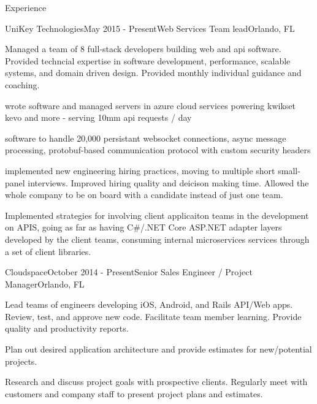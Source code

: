\documentclass{resume} %
\begin{document}
\begin{rSection}{Experience}


\begin{rSubsection}{UniKey Technologies}{May 2015 - Present}{Web Services Team lead}{Orlando, FL}

\item Managed a team of 8 full-stack developers building web and api software.  Provided techncial expertise in software development, performance, scalable systems, and domain driven design.  Provided monthly individual guidance and coaching.
\item wrote software and managed servers in azure cloud services powering kwikset kevo and more - serving 10mm api requests / day
\item software to handle 20,000 persistant websocket connections, async message processing, protobuf-based communication protocol with custom security headers
\item implemented new engineering hiring practices, moving to multiple short small-panel interviews.  Improved hiring quality and deicison making time.  Allowed the whole company to be on board with a candidate instead of just one team.
\item Implemented strategies for involving client applicaiton teams in the development on APIS, going as far as having C#/.NET Core ASP.NET adapter layers developed by the client teams, consuming internal microservices services through a set of client libraries.


\end{rSubsection}



\begin{rSubsection}{Cloudspace}{October 2014 - Present}{Senior Sales Engineer / Project Manager}{Orlando, FL}

\item Lead teams of engineers developing iOS, Android, and Rails API/Web apps.  Review, test, and approve new code.  Facilitate team member learning.  Provide quality and productivity reports.
\item Plan out desired application architecture and provide estimates for new/potential projects.
\item Research and discuss project goals with prospective clients. Regularly meet with customers and company staff to present project plans and estimates.


\end{rSubsection}
\end{rSection}
\end{document}
